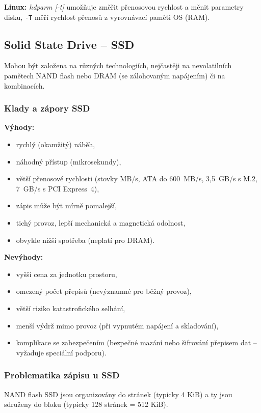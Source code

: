 \documentclass[a4paper, 11pt]{article}
\begin{document}
 
\textbf{Linux:}
\textit{hdparm [-t]} umožňuje změřit přenosovou rychlost a měnit parametry disku, \verb|-T| měří rychlost přenosů z vyrovnávací paměti OS (RAM).


\subsection{Solid State Drive -- SSD}
Mohou být založena na různých technologiích, nejčastěji na nevolatilních pamětech NAND flash nebo DRAM (se zálohovaným napájením) či na kombinacích.

\subsubsection{Klady a zápory SSD}
 \textbf{Výhody:}
\begin{itemize}
    \item rychlý (okamžitý) náběh,
    \item náhodný přístup (mikrosekundy),
    \item větší přenosové rychlosti (stovky MB/s, ATA do 600~MB/s, 3,5~GB/s s M.2, 7~GB/s s PCI Express~4),
    \item zápis může být mírně pomalejší,
    \item tichý provoz, lepší mechanická a magnetická odolnost,
    \item obvykle nižší spotřeba (neplatí pro DRAM).
\end{itemize}
 
 \textbf{Nevýhody:}
\begin{itemize}
    \item vyšší cena za jednotku prostoru,
    \item omezený počet přepisů (nevýznamné pro běžný provoz),
    \item větší riziko katastrofického selhání, 
    \item menší výdrž mimo provoz (při vypnutém napájení a skladování),
    \item komplikace se zabezpečením (bezpečné mazání nebo šifrování přepisem dat -- vyžaduje speciální podporu).
\end{itemize}

\subsubsection{Problematika zápisu u SSD}
NAND flash SSD jsou organizovány do stránek (typicky 4 KiB) a ty jsou sdruženy do bloku (typicky 128 stránek = 512 KiB).
 
\end{document}
